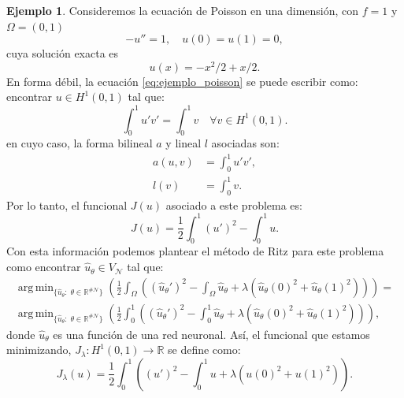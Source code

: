 \documentclass[a4paper,11pt,spanish, twoside, leqno]{tfg-uam}
\DeclareMathOperator*{\argmin}{arg\,min}
\theoremstyle{definition}
\newtheorem{exmp}[teor]{Ejemplo}
\begin{document}
\begin{mdframed}  
    \begin{exmp}
        Consideremos la ecuación de Poisson en una dimensión, con $f = 1$ y $\Omega=(0,1)$
        \begin{equation}\label{eq:ejemplo_poisson}
        -u'' = 1, \quad u(0) = u(1) = 0,
        \end{equation} 
        cuya solución exacta es 
        \begin{equation*}
        u(x) = -x^2/2 + x/2.
        \end{equation*}
        En forma débil, la ecuación \eqref{eq:ejemplo_poisson} se puede escribir como: encontrar $ u \in H^1(0,1) $ tal que:
        \begin{equation*}
            \int_0^1 u'v' = \int_0^1 v \quad \forall v \in H^1(0,1).
        \end{equation*}
        en cuyo caso, la forma bilineal $a$ y lineal $l$ asociadas son:
        \begin{align*}
            a(u,v) &= \int_0^1 u'v', \\
            l(v) &= \int_0^1 v.
        \end{align*}
        Por lo tanto, el funcional $ J(u) $ asociado a este problema es:
        \begin{equation*}
            J(u) = \frac{1}{2} \int_0^1 (u')^2 - \int_0^1 u.
        \end{equation*}
        Con esta información podemos plantear el método de Ritz para este problema como encontrar $ \hat{u}_\theta \in V_{\mathcal{N}} $ tal que: 
        \begin{align*}
        \argmin_{\{\hat{u}_\theta:\; \theta \in \mathbb{R}^{\#\mathcal{N}} \}} \left( \frac{1}{2} \int_\Omega \left((\hat{u}_\theta')^2 - \int_\Omega \hat{u}_\theta + \lambda (\hat{u}_\theta(0)^2 + \hat{u}_\theta(1)^2)\right)\right) =\\
        \argmin_{\{\hat{u}_\theta:\; \theta \in \mathbb{R}^{\#\mathcal{N}} \}} \left(\frac{1}{2} \int_0^1 \left((\hat{u}_\theta')^2 - \int_0^1 \hat{u}_\theta + \lambda (\hat{u}_\theta(0)^2 + \hat{u}_\theta(1)^2)\right)\right),
        \end{align*}
        donde $\hat{u}_\theta$ es una función de una red neuronal. Así, el funcional que estamos minimizando, $J_\lambda: H^1(0,1) \to \mathbb{R}$ se define como:
        \begin{equation*}
        J_\lambda(u) = \frac{1}{2} \int_0^1 \left((u')^2 - \int_0^1 u + \lambda (u(0)^2 + u(1)^2)\right).

\end{equation*}
\end{exmp}
\end{mdframed}
\end{document}
